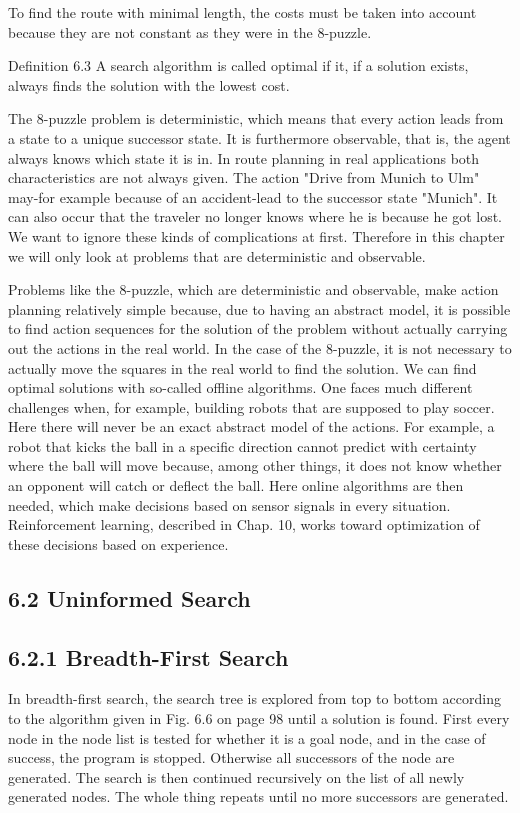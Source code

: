 \documentclass[10pt]{book}
\begin{document}
\begin{center}
To find the route with minimal length, the costs must be taken into account because they are not constant as they were in the 8-puzzle.

Definition 6.3 A search algorithm is called optimal if it, if a solution exists, always finds the solution with the lowest cost.

The 8-puzzle problem is deterministic, which means that every action leads from a state to a unique successor state. It is furthermore observable, that is, the agent always knows which state it is in. In route planning in real applications both characteristics are not always given. The action "Drive from Munich to Ulm" may-for example because of an accident-lead to the successor state "Munich". It can also occur that the traveler no longer knows where he is because he got lost. We want to ignore these kinds of complications at first. Therefore in this chapter we will only look at problems that are deterministic and observable.

Problems like the 8-puzzle, which are deterministic and observable, make action planning relatively simple because, due to having an abstract model, it is possible to find action sequences for the solution of the problem without actually carrying out the actions in the real world. In the case of the 8-puzzle, it is not necessary to actually move the squares in the real world to find the solution. We can find optimal solutions with so-called offline algorithms. One faces much different challenges when, for example, building robots that are supposed to play soccer. Here there will never be an exact abstract model of the actions. For example, a robot that kicks the ball in a specific direction cannot predict with certainty where the ball will move because, among other things, it does not know whether an opponent will catch or deflect the ball. Here online algorithms are then needed, which make decisions based on sensor signals in every situation. Reinforcement learning, described in Chap. 10, works toward optimization of these decisions based on experience.

\subsection*{6.2 Uninformed Search}
\subsection*{6.2.1 Breadth-First Search}
In breadth-first search, the search tree is explored from top to bottom according to the algorithm given in Fig. 6.6 on page 98 until a solution is found. First every node in the node list is tested for whether it is a goal node, and in the case of success, the program is stopped. Otherwise all successors of the node are generated. The search is then continued recursively on the list of all newly generated nodes. The whole thing repeats until no more successors are generated.


\end{center}
\end{document}
